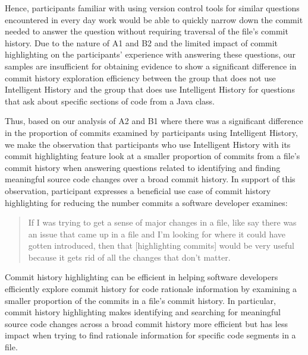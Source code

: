 \begin{center}
\end{center}

Hence, participants familiar with using version control tools for similar questions encountered in every day work would be able to quickly narrow down the commit needed to answer the question without requiring traversal of the file's commit history.
Due to the nature of A1 and B2 and the limited impact of commit highlighting on the participants' experience with answering these questions,
our samples are insufficient for obtaining evidence to show a significant difference in commit history exploration efficiency between the group that does not use Intelligent History and the group that does use Intelligent History for questions that ask about specific sections of code from a Java class.

Thus, based on our analysis of A2 and B1 where there was a significant difference in the proportion of commits examined by participants using Intelligent History, 
we make the observation that participants who use Intelligent History with its commit highlighting feature look at a smaller proportion of commits from a file's commit history when answering questions related to
identifying and finding meaningful source code changes over a broad commit history.
In support of this observation, 
participant  expresses a beneficial use case of commit history highlighting for reducing the number commits a software developer examines:

\begin{quote}
  If I was trying to get a sense of major changes in a file, like say there was an issue that came up in a file and I’m looking for where it could have gotten introduced, 
  then that [highlighting commits] would be very useful because it gets rid of all the changes that don’t matter. 
\end{quote}

\begin{summary}[RQ2]
  Commit history highlighting can be efficient in helping software developers efficiently explore commit history for code rationale information by examining a smaller proportion of the commits in a file's commit history.
  In particular, commit history highlighting makes identifying and searching for meaningful source code changes across a broad commit history more efficient but has less impact when trying to find rationale information for specific code segments in a file.
\end{summary}

